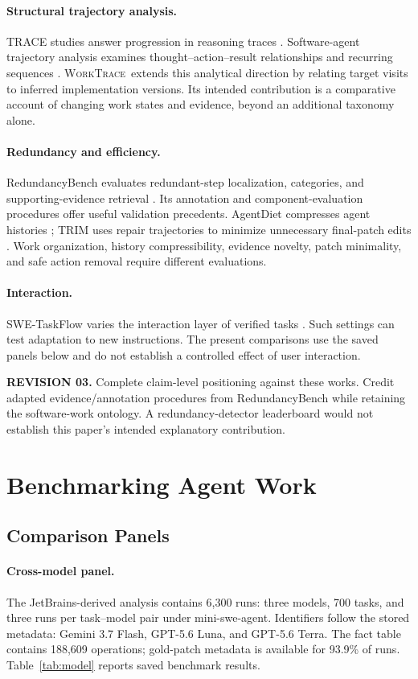 \documentclass[10pt,a4paper,twocolumn]{article}
\newcommand{\rev}[2]{\par\smallskip\noindent\begin{minipage}{\linewidth}\color{revision}\footnotesize\textbf{REVISION #1.} #2\end{minipage}\par\smallskip}
\newcommand{\wt}{\textsc{WorkTrace}}
\begin{document}
\paragraph{Structural trajectory analysis.}
TRACE studies answer progression in reasoning traces \citep{trace}. Software-agent trajectory analysis examines thought--action--result relationships and recurring sequences \citep{bouzenia}. \wt\ extends this analytical direction by relating target visits to inferred implementation versions. Its intended contribution is a comparative account of changing work states and evidence, beyond an additional taxonomy alone.
\paragraph{Redundancy and efficiency.}
RedundancyBench evaluates redundant-step localization, categories, and supporting-evidence retrieval \citep{redundancybench}. Its annotation and component-evaluation procedures offer useful validation precedents. AgentDiet compresses agent histories \citep{agentdiet}; TRIM uses repair trajectories to minimize unnecessary final-patch edits \citep{trim}. Work organization, history compressibility, evidence novelty, patch minimality, and safe action removal require different evaluations.
\paragraph{Interaction.}
SWE-TaskFlow varies the interaction layer of verified tasks \citep{taskflow}. Such settings can test adaptation to new instructions. The present comparisons use the saved panels below and do not establish a controlled effect of user interaction.
\rev{03}{Complete claim-level positioning against these works. Credit adapted evidence/annotation procedures from RedundancyBench while retaining the software-work ontology. A redundancy-detector leaderboard would not establish this paper's intended explanatory contribution.}

\section{Benchmarking Agent Work}
\subsection{Comparison Panels}
\paragraph{Cross-model panel.}
The JetBrains-derived analysis contains 6,300 runs: three models, 700 tasks, and three runs per task--model pair under mini-swe-agent. Identifiers follow the stored metadata: Gemini 3.7 Flash, GPT-5.6 Luna, and GPT-5.6 Terra. The fact table contains 188,609 operations; gold-patch metadata is available for 93.9\% of runs. Table~\ref{tab:model} reports saved benchmark results.
\end{document}
